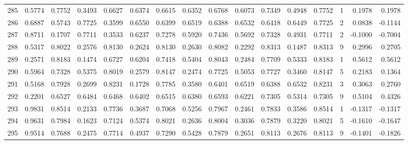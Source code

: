 \begin{tabular}{lrrrrrrrrrrrrrrr}
285 &      0.5774 &  0.7752 &  0.3493 &  0.6627 &  0.6374 &  0.6615 &  0.6352 &  0.6768 &  0.6073 &  0.7349 &   0.4948 &     0.7752 &      1 &                    0.1978 &                     0.1978 \\
286 &      0.6887 &  0.5743 &  0.7725 &  0.3599 &  0.6550 &  0.6399 &  0.6519 &  0.6388 &  0.6532 &  0.6418 &   0.6449 &     0.7725 &      2 &                    0.0838 &                    -0.1144 \\
287 &      0.8711 &  0.1707 &  0.7711 &  0.3533 &  0.6237 &  0.7278 &  0.5920 &  0.7436 &  0.5692 &  0.7328 &   0.4931 &     0.7711 &      2 &                   -0.1000 &                    -0.7004 \\
288 &      0.5317 &  0.8022 &  0.2576 &  0.8130 &  0.2624 &  0.8130 &  0.2630 &  0.8082 &  0.2292 &  0.8313 &   0.1487 &     0.8313 &      9 &                    0.2996 &                     0.2705 \\
289 &      0.2571 &  0.8183 &  0.1474 &  0.6727 &  0.6204 &  0.7418 &  0.5404 &  0.8043 &  0.2484 &  0.7709 &   0.5333 &     0.8183 &      1 &                    0.5612 &                     0.5612 \\
290 &      0.5964 &  0.7328 &  0.5375 &  0.8019 &  0.2579 &  0.8147 &  0.2474 &  0.7725 &  0.5053 &  0.7727 &   0.3460 &     0.8147 &      5 &                    0.2183 &                     0.1364 \\
291 &      0.5168 &  0.7928 &  0.2699 &  0.8231 &  0.1728 &  0.7785 &  0.3580 &  0.6401 &  0.6519 &  0.6388 &   0.6532 &     0.8231 &      3 &                    0.3063 &                     0.2760 \\
292 &      0.2201 &  0.6527 &  0.6484 &  0.6468 &  0.6402 &  0.6515 &  0.6380 &  0.6593 &  0.6221 &  0.7305 &   0.5314 &     0.7305 &      9 &                    0.5104 &                     0.4326 \\
293 &      0.9831 &  0.8514 &  0.2133 &  0.7736 &  0.3687 &  0.7068 &  0.5256 &  0.7967 &  0.2461 &  0.7833 &   0.3586 &     0.8514 &      1 &                   -0.1317 &                    -0.1317 \\
294 &      0.9631 &  0.7984 &  0.1623 &  0.7124 &  0.5374 &  0.8021 &  0.2636 &  0.8004 &  0.3036 &  0.7879 &   0.3220 &     0.8021 &      5 &                   -0.1610 &                    -0.1647 \\
295 &      0.9514 &  0.7688 &  0.2475 &  0.7714 &  0.4937 &  0.7290 &  0.5428 &  0.7879 &  0.2651 &  0.8113 &   0.2676 &     0.8113 &      9 &                   -0.1401 &                    -0.1826 \\

\end{tabular}

